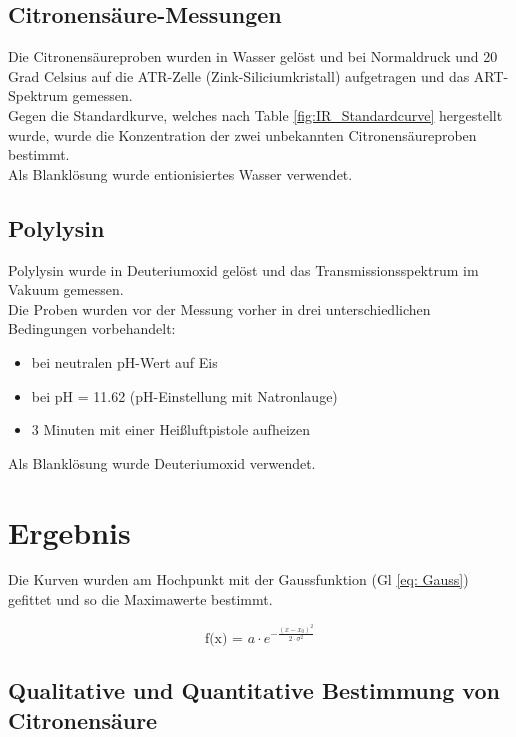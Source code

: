 \documentclass[10pt,a4paper]{article}
\begin{document}
	\subsection{Citronensäure-Messungen}
	Die Citronensäureproben wurden in Wasser gelöst und bei Normaldruck und 20 Grad Celsius auf die ATR-Zelle (Zink-Siliciumkristall) aufgetragen und das ART-Spektrum gemessen.\\
	Gegen die Standardkurve, welches nach Table \ref{fig:IR_Standardcurve} hergestellt wurde, wurde die Konzentration der zwei unbekannten Citronensäureproben bestimmt.\\
	Als Blanklösung wurde entionisiertes Wasser verwendet.\\
	

	\subsection{Polylysin}
	Polylysin wurde in Deuteriumoxid gelöst und das Transmissionsspektrum im Vakuum gemessen.\\
	Die Proben wurden vor der Messung vorher in drei unterschiedlichen Bedingungen vorbehandelt:
	\begin{itemize}
		\item bei neutralen pH-Wert auf Eis
		\item bei pH = 11.62 (pH-Einstellung mit Natronlauge)
		\item 3 Minuten mit einer Heißluftpistole aufheizen
	\end{itemize}
	Als Blanklösung wurde Deuteriumoxid verwendet.
	
	
	
	\section{Ergebnis}
	Die Kurven wurden am Hochpunkt mit der Gaussfunktion (Gl \ref{eq: Gauss}) gefittet und so die Maximawerte bestimmt.

	\begin{equation}\label{eq: Gauss}
		\text{f(x) = } a \cdot e^{-\frac{(x-x_0)^2}{2 \cdot \sigma^2}}
	\end{equation}
	
	\subsection{Qualitative und Quantitative Bestimmung von Citronensäure}
	
\end{document}
